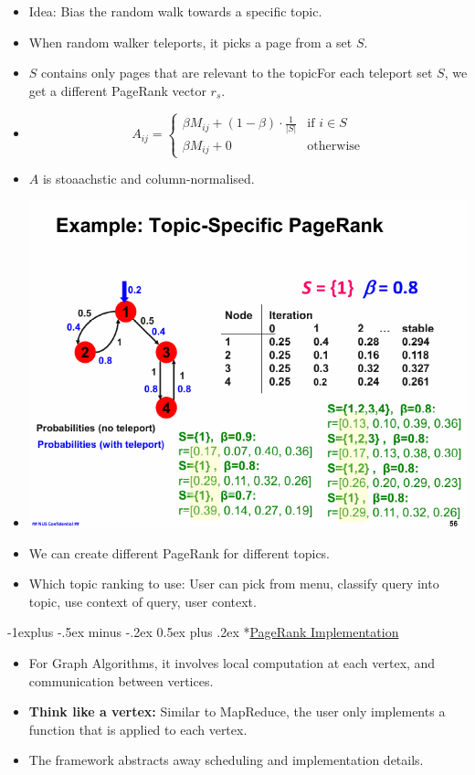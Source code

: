 \documentclass[10pt, landscape]{article}
\makeatletter
\renewcommand{\subsection}{\@startsection{subsection}{2}{0mm}%
  {-1explus -.5ex minus -.2ex}%
  {0.5ex plus .2ex}%
{\normalfont\normalsize\bfseries}}
\makeatother
\begin{document}
\begin{multicols*}{4}
    \begin{itemize}
      \item Idea: Bias the random walk towards a specific topic.
      \item When random walker teleports, it picks a page from a set $S$.
      \item $S$ contains only pages that are relevant to the topicFor each teleport set $S$, we get a different PageRank vector $r_s$.
      \item \begin{equation*}
        A_{ij} =
        \begin{cases}
          \beta M_{ij} + (1 - \beta) \cdot \frac{1}{|S|} &\text{if } i \in S\\
          \beta M_{ij} + 0  &\text{otherwise}
        \end{cases}
      \end{equation*}
       \item $A$ is stoaachstic and column-normalised.
       \item \includegraphics*[width=0.95\linewidth]{topic_specific_variables.png}
       \item We can create different PageRank for different topics.
       \item Which topic ranking to use: User can pick from menu, classify query into topic, use context of query, user context.
    \end{itemize}

    \subsection*{\underline{PageRank Implementation}}
    \begin{itemize}
      \item For Graph Algorithms, it involves local computation at each vertex, and communication between vertices.
      \item \textbf{Think like a vertex:} Similar to MapReduce, the user only implements a function that is applied to each vertex.
      \item The framework abstracts away scheduling and implementation details.
    \end{itemize}


\end{multicols*}
\end{document}
